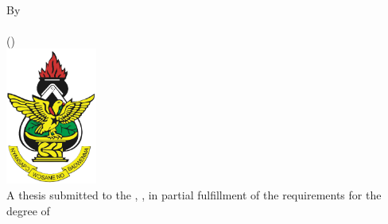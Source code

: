 
\begin{titlepage}
\thispagestyle{empty} %
\begin{center}

{\Large \textbf{\MakeUppercase{\thesistitle}}}\\[1.5cm]

{\large By\\[0.5cm]
\thesisauthor\\[0.15cm]
(\thesispreviousdegrees)}\\[1.5cm]


\includegraphics[width=3cm]{images/knust-logo.png}\\[1.5cm]


{\large A thesis submitted to the \thesisdepartment, \thesisuniversity, in partial fulfillment of the requirements for the degree of\\[1.5cm]
\MakeUppercase{\thesisdegree}}\\[2.5cm]


{\large \thesisdate}

\end{center}
\end{titlepage}

\setcounter{page}{2}
